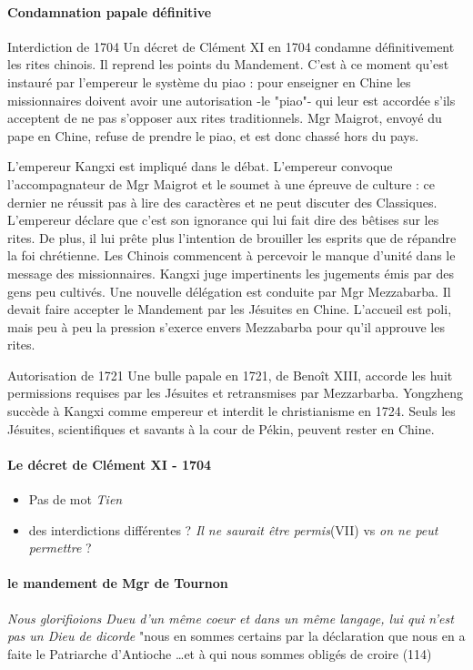 \paragraph{Condamnation papale définitive}
Interdiction de 1704
Un décret de Clément XI en 1704 condamne définitivement les rites chinois. Il reprend les points du Mandement. C'est à ce moment qu'est instauré par l'empereur le système du piao : pour enseigner en Chine les missionnaires doivent avoir une autorisation -le "piao"- qui leur est accordée s’ils acceptent de ne pas s’opposer aux rites traditionnels. Mgr Maigrot, envoyé du pape en Chine, refuse de prendre le piao, et est donc chassé hors du pays.

L'empereur Kangxi est impliqué dans le débat. L'empereur convoque l'accompagnateur de Mgr Maigrot et le soumet à une épreuve de culture : ce dernier ne réussit pas à lire des caractères et ne peut discuter des Classiques. L'empereur déclare que c'est son ignorance qui lui fait dire des bêtises sur les rites. De plus, il lui prête plus l'intention de brouiller les esprits que de répandre la foi chrétienne. Les Chinois commencent à percevoir le manque d'unité dans le message des missionnaires. Kangxi juge impertinents les jugements émis par des gens peu cultivés. Une nouvelle délégation est conduite par Mgr Mezzabarba. Il devait faire accepter le Mandement par les Jésuites en Chine. L'accueil est poli, mais peu à peu la pression s'exerce envers Mezzabarba pour qu'il approuve les rites.

Autorisation de 1721
Une bulle papale en 1721, de Benoît XIII, accorde les huit permissions requises par les Jésuites et retransmises par Mezzarbarba. Yongzheng succède à Kangxi comme empereur et interdit le christianisme en 1724. Seuls les Jésuites, scientifiques et savants à la cour de Pékin, peuvent rester en Chine.


\paragraph{Le décret de Clément XI - 1704}
\begin{itemize}
    \item Pas de mot \textit{Tien }
    \item des interdictions différentes ? \textit{Il ne saurait être permis}(VII) vs  \textit{on ne peut permettre} ?
\end{itemize}

\paragraph{le mandement de Mgr de Tournon}
\textit{Nous glorifioions Dueu d'un même coeur et dans un même langage, lui qui n'est pas un Dieu de dicorde}
"nous en sommes certains par la déclaration que nous en a faite le Patriarche d'Antioche \ldots et à qui nous sommes obligés de croire (114)

